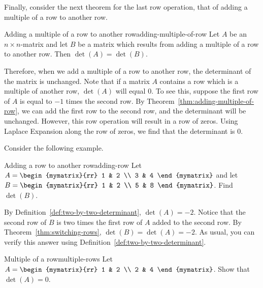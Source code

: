 Finally, consider the next theorem for the last row operation, that of
adding a multiple of a row to another row.

\begin{theorem}{Adding a multiple of a row to another row}{adding-multiple-of-row}
  Let $A$ be an $n\times n$-matrix and let $B$ be a matrix which
  results from adding a multiple of a row to another row.  Then
  $\det (A) =\det (B)$.
\end{theorem}

Therefore, when we add a multiple of a row to another row, the
determinant of the matrix is unchanged.  Note that if a matrix $A$
contains a row which is a multiple of another row, $\det (A)$ will
equal $0$. To see this, suppose the first row of $A$ is equal to $-1$
times the second row. By Theorem~\ref{thm:adding-multiple-of-row}, we
can add the first row to the second row, and the determinant will be
unchanged. However, this row operation will result in a row of zeros.
Using Laplace Expansion along the row of zeros, we find that the
determinant is $0$.

Consider the following example.

\begin{example}{Adding a row to another row}{adding-row}
  Let $A=\begin{mymatrix}{rr}
    1 & 2 \\
    3 & 4
  \end{mymatrix} $ and let $B=\begin{mymatrix}{rr}
    1 & 2 \\
    5 & 8
  \end{mymatrix}$. 
  Find $\det (B)$.
\end{example}

\begin{solution}
  By Definition~\ref{def:two-by-two-determinant}, $\det (A) = -2$.
  Notice that the second row of $B$ is two times the first row of $A$
  added to the second row.  By Theorem~\ref{thm:switching-rows},
  $\det (B) = \det (A) =-2$.  As usual, you can verify this answer
  using Definition~\ref{def:two-by-two-determinant}.
\end{solution}

\begin{example}{Multiple of a row}{multiple-rows}
  Let $A = \begin{mymatrix}{rr}
    1 & 2 \\
    2 & 4 
  \end{mymatrix}$. Show that $\det (A) = 0$. 
\end{example}

